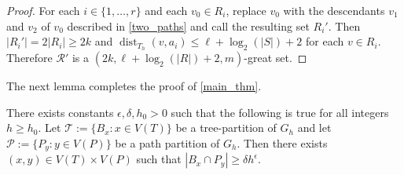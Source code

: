 \documentclass{patmorin}
\DeclareMathOperator{\dist}{dist}
\renewcommand{\le}{\leqslant}
\renewcommand{\ge}{\geqslant}
\begin{document}
\begin{proof}
  For each $i\in\{1,\ldots,r\}$ and each $v_0\in R_i$, replace $v_0$ with the descendants $v_1$ and $v_2$ of $v_0$ described in \cref{two_paths} and call the resulting set $R_i'$.   Then $|R_i'|=2|R_i|\ge 2k$ and $\dist_{T_h}(v,a_i)\le \ell+\log_2(|S|)+2$ for each $v\in R_i$.  Therefore $\mathcal{R}'$ is a $(2k,\ell + \log_2(|R|)+2,m)$-great set.
\end{proof}

The next lemma completes the proof of \cref{main_thm}.
\begin{lem}\label{big_lemma}
  There exists constants $\epsilon,\delta, h_0 >0$ such that the following is true for all integers $h\ge h_0$. Let $\mathcal{T}:=\{B_x:x\in V(T)\}$ be a tree-partition of $G_h$ and let $\mathcal{P}:=\{P_y:y\in V(P)\}$ be a path partition of $G_h$.  Then there exists $(x,y)\in V(T)\times V(P)$ such that $|B_x\cap P_y| \ge \delta h^\epsilon$.
\end{lem}
\end{document}
